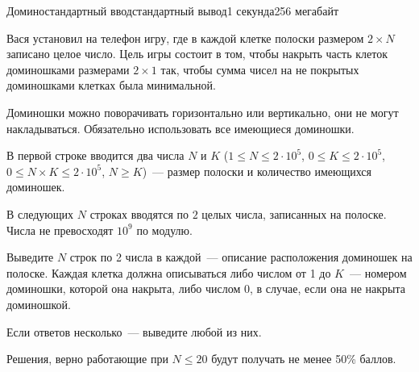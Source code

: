 \begin{problem}{Домино}{стандартный ввод}{стандартный вывод}{1 секунда}{256 мегабайт}

Вася установил на телефон игру, где в каждой клетке полоски размером $2 \times N$ записано целое число. Цель игры состоит в том, чтобы накрыть часть клеток доминошками размерами $2 \times 1$ так, чтобы сумма чисел на не покрытых доминошками клетках была минимальной. 

Доминошки можно поворачивать горизонтально или вертикально, они не могут накладываться. Обязательно использовать все имеющиеся доминошки.

\InputFile
В первой строке вводится два числа $N$ и $K$ ($1 \leq N \leq 2\cdot 10^5$, $0 \leq K \leq 2\cdot 10^5$, $0 \leq N \times K \leq 2\cdot 10^5$, $N \geq K$)~--- размер полоски и количество имеющихся доминошек.

В следующих $N$ строках вводятся по $2$ целых числа, записанных на полоске. Числа не превосходят $10^9$ по модулю.

\OutputFile
Выведите $N$ строк по 2 числа в каждой~--- описание расположения доминошек на полоске. Каждая клетка должна описываться либо числом от 1 до $K$~--- номером доминошки, которой она накрыта, либо числом 0, в случае, если она не накрыта доминошкой.

Если ответов несколько~--- выведите любой из них.

\Examples

\begin{example}
%
%
\end{example}

\Note
Решения, верно работающие при $N \le 20$ будут получать не менее 50\% баллов.

\end{problem}

